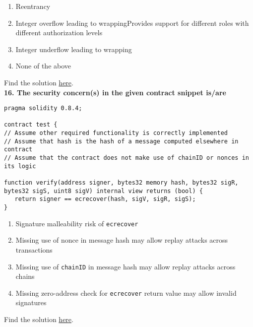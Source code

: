 \begin{enumerate}[label=\Alph*.]
    \item Reentrancy
    \item Integer overflow leading to wrappingProvides support for different roles with different authorization levels
    \item Integer underflow leading to wrapping
    \item None of the above
\end{enumerate}

Find the solution \hyperref[sec:exam4_q15]{here}.\\

\textbf{16. The security concern(s) in the given contract snippet is/are}

\begin{lstlisting}[language=Solidity, style=solStyle]
pragma solidity 0.8.4;

contract test {
// Assume other required functionality is correctly implemented
// Assume that hash is the hash of a message computed elsewhere in contract
// Assume that the contract does not make use of chainID or nonces in its logic

function verify(address signer, bytes32 memory hash, bytes32 sigR, bytes32 sigS, uint8 sigV) internal view returns (bool) {
   return signer == ecrecover(hash, sigV, sigR, sigS);
}
\end{lstlisting}

\begin{enumerate}[label=\Alph*.]
    \item Signature malleability risk of \verb|ecrecover|
    \item Missing use of nonce in message hash may allow replay attacks across transactions
    \item Missing use of \verb|chainID| in message hash may allow replay attacks across chains
    \item Missing zero-address check for \verb|ecrecover| return value may allow invalid signatures
\end{enumerate}

Find the solution \hyperref[sec:exam4_q16]{here}.